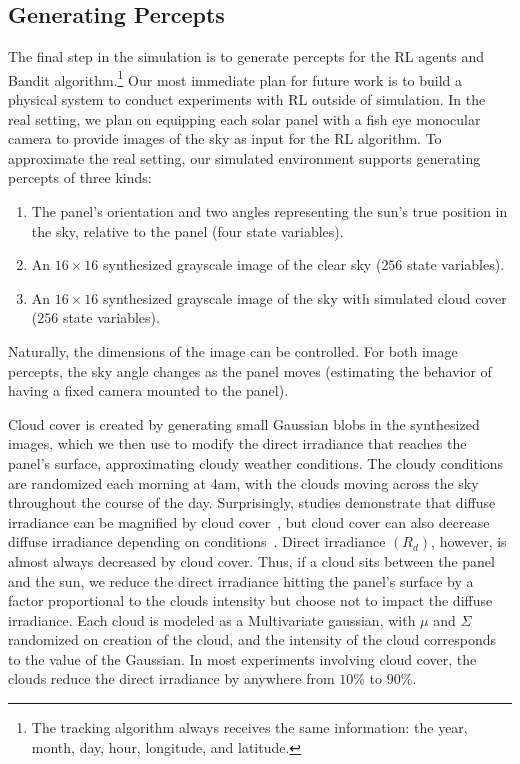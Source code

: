 \documentclass{article}
\begin{document}
\subsection{Generating Percepts}

The final step in the simulation is to generate percepts for the RL agents and Bandit algorithm.\footnote{The tracking algorithm always receives the same information: the year, month, day, hour, longitude, and latitude.} Our most immediate plan for future work is to build a physical system to conduct experiments with RL outside of simulation. In the real setting, we plan on equipping each solar panel with a fish eye monocular camera to provide images of the sky as input for the RL algorithm. To approximate the real setting, our simulated environment supports generating percepts of three kinds:
\begin{enumerate}
\item The panel's orientation and two angles representing the sun's true position in the sky, relative to the panel (four state variables).
\item An $16 \times 16$ synthesized grayscale image of the clear sky ($256$ state variables).
\item An $16\times 16$ synthesized grayscale image of the sky with simulated cloud cover ($256$ state variables).
\end{enumerate}
Naturally, the dimensions of the image can be controlled. For both image percepts, the sky angle changes as the panel moves (estimating the behavior of having a fixed camera mounted to the panel).

Cloud cover is created by generating small Gaussian blobs in the synthesized images, which we then use to modify the direct irradiance that reaches the panel's surface, approximating cloudy weather conditions. The cloudy conditions are randomized each morning at 4am, with the clouds moving across the sky throughout the course of the day. Surprisingly, studies demonstrate that diffuse irradiance can be magnified by cloud cover~\cite{robinson1966solar}, but cloud cover can also decrease diffuse irradiance depending on conditions~\cite{pfister2003cloud}. Direct irradiance $(R_d)$, however, is almost always decreased by cloud cover. Thus, if a cloud sits between the panel and the sun, we reduce the direct irradiance hitting the panel's surface by a factor proportional to the clouds intensity but choose not to impact the diffuse irradiance. Each cloud is modeled as a Multivariate gaussian, with $\mu$ and $\Sigma$ randomized on creation of the cloud, and the intensity of the cloud corresponds to the value of the Gaussian. In most experiments involving cloud cover, the clouds reduce the direct irradiance by anywhere from $10\%$ to $90\%$.
\end{document}
